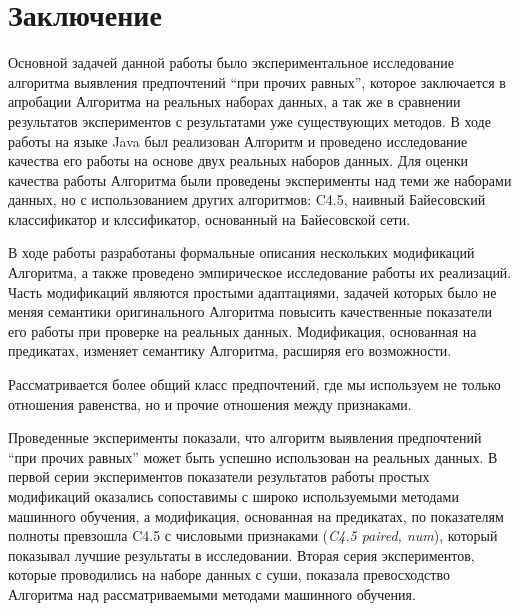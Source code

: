 \chapter*{Заключение}
\label{ch:ending}

Основной задачей данной работы было экспериментальное исследование алгоритма выявления предпочтений \enquote{при прочих равных}, которое заключается в апробации Алгоритма на реальных наборах данных, а так же в сравнении результатов экспериментов с результатами уже существующих методов. В ходе работы на языке Java был реализован Алгоритм и проведено исследование качества его работы на основе двух реальных наборов данных. Для оценки качества работы Алгоритма были проведены эксперименты над теми же наборами данных, но с использованием других алгоритмов: C4.5, наивный Байесовский классификатор и клссификатор, основанный на Байесовской сети.

В ходе работы разработаны формальные описания нескольких модификаций Алгоритма, а также проведено эмпирическое исследование работы их реализаций. Часть модификаций являются простыми адаптациями, задачей которых было не меняя семантики оригинального Алгоритма повысить качественные показатели его работы при проверке на реальных данных. Модификация, основанная на предикатах, изменяет семантику Алгоритма, расширяя его возможности. 

Рассматривается более общий класс предпочтений, где мы используем не только отношения равенства, но и прочие отношения между признаками.

Проведенные эксперименты показали, что алгоритм выявления предпочтений \enquote{при прочих равных} может быть успешно использован на реальных данных. В первой серии экспериментов показатели результатов работы простых модификаций оказались сопоставимы с широко используемыми методами машинного обучения, а модификация, основанная на предикатах, по показателям полноты превзошла C4.5 с числовыми признаками (\emph{C4.5 paired, num}), который показывал лучшие результаты в исследовании. Вторая серия экспериментов, которые проводились на наборе данных с суши, показала превосходство Алгоритма над рассматриваемыми методами машинного обучения. 
